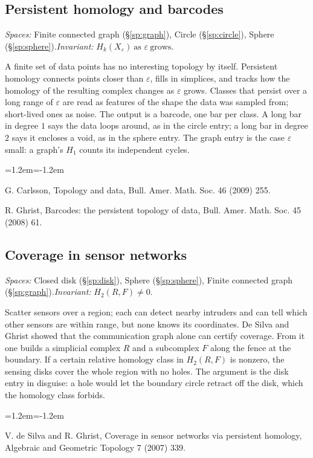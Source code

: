 \documentclass[11pt,twoside]{book}
\begin{document}
\subsection{Persistent homology and barcodes}\label{app:app-barcodes}
\noindent\textit{Spaces:} Finite connected graph (\S\ref{sp:graph}), Circle (\S\ref{sp:circle}), Sphere (\S\ref{sp:sphere}).\enspace\textit{Invariant:} $H_k(X_\varepsilon)\ \text{as }\varepsilon\ \text{grows}$.

A finite set of data points has no interesting topology by itself. Persistent homology connects points closer than $\varepsilon$, fills in simplices, and tracks how the homology of the resulting complex changes as $\varepsilon$ grows. Classes that persist over a long range of $\varepsilon$ are read as features of the shape the data was sampled from; short-lived ones as noise. The output is a barcode, one bar per class. A long bar in degree $1$ says the data loops around, as in the circle entry; a long bar in degree $2$ says it encloses a void, as in the sphere entry. The graph entry is the case $\varepsilon$ small: a graph's $H_1$ counts its independent cycles.
\begin{list}{}{\leftmargin=1.2em\itemindent=-1.2em\itemsep=0pt}\small \item G. Carlsson, Topology and data, Bull. Amer. Math. Soc. 46 (2009) 255.\item R. Ghrist, Barcodes: the persistent topology of data, Bull. Amer. Math. Soc. 45 (2008) 61.\end{list}
\subsection{Coverage in sensor networks}\label{app:app-coverage}
\noindent\textit{Spaces:} Closed disk (\S\ref{sp:disk}), Sphere (\S\ref{sp:sphere}), Finite connected graph (\S\ref{sp:graph}).\enspace\textit{Invariant:} $H_2(R,F)\ne0$.

Scatter sensors over a region; each can detect nearby intruders and can tell which other sensors are within range, but none knows its coordinates. De Silva and Ghrist showed that the communication graph alone can certify coverage. From it one builds a simplicial complex $R$ and a subcomplex $F$ along the fence at the boundary. If a certain relative homology class in $H_2(R,F)$ is nonzero, the sensing disks cover the whole region with no holes. The argument is the disk entry in disguise: a hole would let the boundary circle retract off the disk, which the homology class forbids.
\begin{list}{}{\leftmargin=1.2em\itemindent=-1.2em\itemsep=0pt}\small \item V. de Silva and R. Ghrist, Coverage in sensor networks via persistent homology, Algebraic and Geometric Topology 7 (2007) 339.\end{list}
\end{document}

